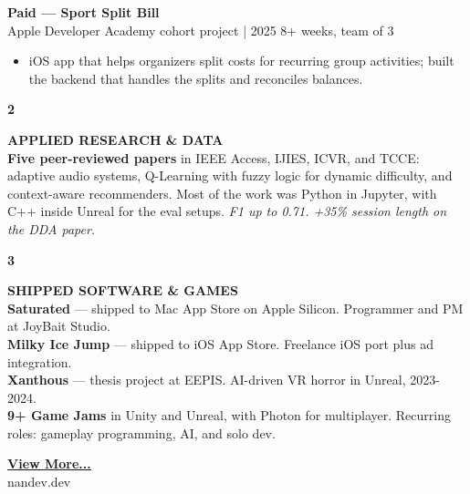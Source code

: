 \documentclass[11pt,a4paper]{article}
\begin{document}
\begin{minipage}[t]{18cm}
\begin{minipage}[t]{17cm}
\vspace{0.3cm}

\textbf{Paid — Sport Split Bill}\\
{\small Apple Developer Academy cohort project | 2025 \textbar{} 8+ weeks, team of 3}
\begin{itemize}[leftmargin=*, nosep, itemsep=2pt, topsep=2pt]
    \item iOS app that helps organizers split costs for recurring group activities; built the backend that handles the splits and reconciles balances.
\end{itemize}

\end{minipage}

\vspace{0.6cm}

\begin{minipage}[t]{0.8cm}
{\Large\bfseries 2}
\end{minipage}%
\begin{minipage}[t]{17cm}
{\large\bfseries APPLIED RESEARCH \& DATA}\\[8pt]

\textbf{Five peer-reviewed papers} in IEEE Access, IJIES, ICVR, and TCCE: adaptive audio systems, Q-Learning with fuzzy logic for dynamic difficulty, and context-aware recommenders. Most of the work was Python in Jupyter, with C++ inside Unreal for the eval setups. \emph{F1 up to 0.71. +35\% session length on the DDA paper.}

\end{minipage}

\vspace{0.5cm}

\begin{minipage}[t]{0.8cm}
{\Large\bfseries 3}
\end{minipage}%
\begin{minipage}[t]{17cm}
{\large\bfseries SHIPPED SOFTWARE \& GAMES}\\[8pt]

\textbf{Saturated} — shipped to Mac App Store on Apple Silicon. Programmer and PM at JoyBait Studio.\\
\textbf{Milky Ice Jump} — shipped to iOS App Store. Freelance iOS port plus ad integration.\\
\textbf{Xanthous} — thesis project at EEPIS. AI-driven VR horror in Unreal, 2023-2024.\\
\textbf{9+ Game Jams} in Unity and Unreal, with Photon for multiplayer. Recurring roles: gameplay programming, AI, and solo dev.

\end{minipage}

\vspace{0.8cm}

\begin{center}
\href{https://nandev.dev}{\bfseries\color{accent}\underline{View More...}}\\[4pt]
{\small nandev.dev}
\end{center}

\end{minipage}
\end{document}
